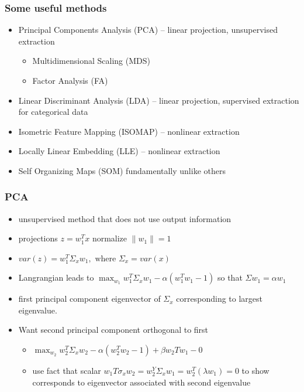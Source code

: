 \documentclass{beamer}
\begin{document}
  \begin{frame}
\frametitle{Some useful methods }
    \begin{itemize}
    \item     {Principal Components Analysis (PCA) -- linear projection, unsupervised extraction}
      \begin{itemize}
    \item Multidimensional Scaling (MDS)
    \item Factor Analysis (FA)
      \end{itemize}
    \item {Linear Discriminant Analysis (LDA) -- linear projection, supervised extraction} for categorical data
    \item Isometric Feature Mapping (ISOMAP) -- nonlinear extraction
    \item Locally Linear Embedding (LLE) -- nonlinear extraction
    \item Self Organizing Maps (SOM) fundamentally unlike others
    \end{itemize}
  \end{frame}

  \begin{frame}
    \frametitle{PCA}
    \begin{itemize}
    \item unsupervised method that does not use output information
    \item projections $z=w_1^Tx$ normalize $ \parallel w_1 \parallel = 1$
    \item $ var(z)= w_1^T \Sigma_x  w_1, \text{ where } \Sigma_x=var(x)$
    \item Langrangian leads to $\max_{w_1} w_1^T\Sigma_x w_1 - \alpha (w_1^Tw_1-1)$ so that
      $\Sigma w_1 = \alpha w_1$ 
    \item first principal component eigenvector of $\Sigma_x$ corresponding to largest eigenvalue.
    \item Want second principal component orthogonal to first
      \begin{itemize}
      \item $\max_{w_2} w_2^T\Sigma_x w_2 - \alpha (w_2^Tw_2-1) + \beta w_2Tw_1-0$
      \item use fact that scalar $w_1T\sigma_x w_2= w_2^Y\Sigma_x w_1=w_2^T (\lambda w_1) = 0$ to show corresponds to eigenvector associated with second eigenvalue
      \end{itemize}
    \end{itemize}
  \end{frame}
\end{document}

